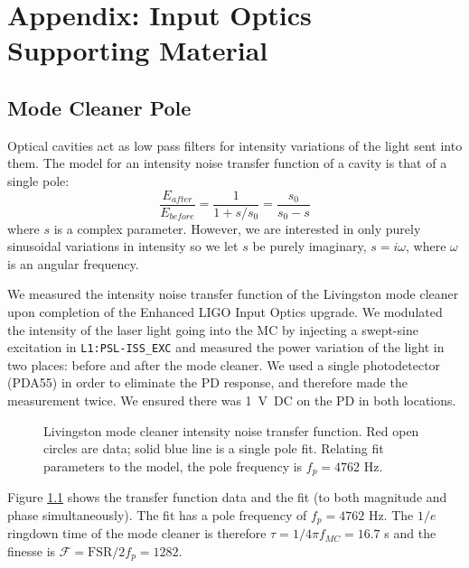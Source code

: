 \chapter{Appendix: Input Optics Supporting Material}



\section{Mode Cleaner Pole}
\label{sec:MCpole}
Optical cavities act as low pass filters for intensity variations of
the light sent into them. The model for an intensity noise transfer
function of a cavity is that of a single pole:
\begin{equation}
\frac{E_{after}}{E_{before}} = \frac{1}{1 + s/s_0} = \frac{s_0}{s_0 - s}
\end{equation}
where $s$ is a complex parameter. However, we are interested in only
purely sinusoidal variations in intensity so we let $s$ be purely
imaginary, $s=i\omega$, where $\omega$ is an angular frequency.

We measured the intensity noise transfer function of the Livingston
mode cleaner upon completion of the Enhanced LIGO Input Optics
upgrade. We modulated the intensity of the laser light going into the
MC by injecting a swept-sine excitation in \texttt{L1:PSL-ISS\_EXC}
and measured the power variation of the light in two places: before
and after the mode cleaner. We used a single photodetector (PDA55) in
order to eliminate the PD response, and therefore made the measurement
twice. We ensured there was 1~V~DC on the PD in both locations.

\begin{figure}
\begin{centering}
\caption[Livingston mode cleaner intensity noise transfer
function]{Livingston mode cleaner intensity noise transfer
  function. Red open circles are data; solid blue line is a single
  pole fit. Relating fit parameters to the model, the pole frequency
  is $f_p=4762$ Hz.}
\label{fig:mcpole}
\end{centering}
\end{figure}

Figure \ref{fig:mcpole} shows the transfer function data and the fit
(to both magnitude and phase simultaneously). The fit has a pole
frequency of $f_p=4762$ Hz. The $1/e$ ringdown time of the mode
cleaner is therefore $\tau = 1/4\pi f_{MC} = 16.7$ \micro s and the
finesse is $\mathcal{F} = \mathrm{FSR}/2f_p = 1282$.





